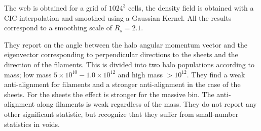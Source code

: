 \documentclass[useAMS,usenatbib]{mn2e}
\newcommand{\hMpc}{{\ifmmode{h^{-1}{\rm Mpc}}\else{$h^{-1}$Mpc }\fi}}
\begin{document}
\begin{itemize}
The web is obtained for a grid of $1024^3$ cells, the density field is
obtained with a CIC interpolation and smoothed using a Gaussian
Kernel. All the results correspond to a smoothing scale of
$R_{s}=2.1$\hMpc.

They report on the angle between the halo angular momentum vector and
the eigenvector corresponding to perpendicular directions to the
sheets and the direction of the filaments. This is divided into two halo
populations according to mass; low mass $5\times 10^{10} - 1.0\times 10^{12}$ and
high mass $>10^{12}$. They find a weak anti-alignment for filaments
and a stronger anti-alignment in the case of the sheets. For the
sheets the effect is stronger for the massive bin. The anti-alignment
along filaments is weak regardless of the mass. They do not report any
other significant statistic, but recognize that they suffer from
small-number statistics in voids.

\end{itemize}



\end{document}
